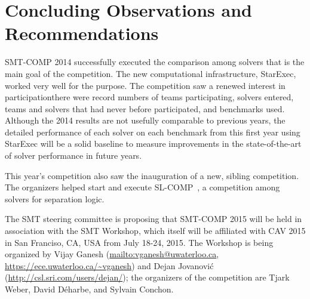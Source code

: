 \documentclass[twoside,11pt]{article}
\begin{document}
\section{Concluding Observations and Recommendations}
\label{sec:conclusions}

SMT-COMP 2014 successfully executed the comparison among solvers that is the main goal
of the competition. The new computational infrastructure, StarExec, worked very well for the purpose. The competition saw a renewed interest in participation\textemdash there were record numbers of teams participating, solvers entered, teams and solvers that had never before participated, and benchmarks used. Although the 2014 results are not usefully comparable to previous years, the detailed performance of each solver on each benchmark from this first year using StarExec will be a solid baseline to measure improvements in the state-of-the-art of solver performance in future years.

This year's competition also saw the inauguration of a new, sibling competition. The organizers helped start and execute SL-COMP~\cite{SLCOMP}, a competition among solvers for separation logic. 

The SMT steering committee is proposing that SMT-COMP 2015 will be held in association with the SMT Workshop, which itself will be affiliated with CAV 2015 in San Franciso, CA, USA from July 18-24, 2015.
The Workshop is being organized by 
Vijay Ganesh (\url{mailto:vganesh@uwaterloo.ca}, \url{https://ece.uwaterloo.ca/~vganesh}) and
Dejan Jovanovi\'c (\url{http://csl.sri.com/users/dejan/}); the organizers of the competition are Tjark Weber, David D\'eharbe, and Sylvain Conchon.
\end{document}
